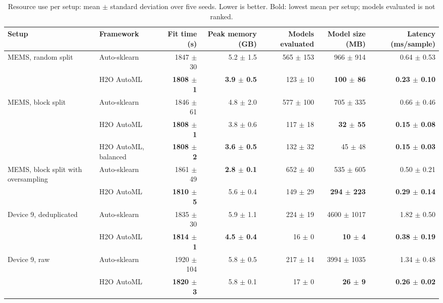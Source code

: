 \begin{table}[t]
\centering
\caption{Resource use per setup: mean $\pm$ standard deviation over five seeds. Lower is better. Bold: lowest mean per setup; models evaluated is not ranked.}
\label{tab:resourcessetup}
\scriptsize
\setlength{\tabcolsep}{3pt}
\begin{tabular}{@{}llrrrrr@{}}
\toprule
Setup & Framework & Fit time (s) & Peak memory (GB) & Models evaluated & Model size (MB) & Latency (ms/sample) \\
\midrule
MEMS, random split & Auto-sklearn & 1847 $\pm$ 30 & 5.2 $\pm$ 1.5 & 565 $\pm$ 153 & 966 $\pm$ 914 & 0.64 $\pm$ 0.53 \\
 & H2O AutoML & \textbf{1808 $\pm$ 1} & \textbf{3.9 $\pm$ 0.5} & 123 $\pm$ 10 & \textbf{100 $\pm$ 86} & \textbf{0.23 $\pm$ 0.10} \\
\midrule
MEMS, block split & Auto-sklearn & 1846 $\pm$ 61 & 4.8 $\pm$ 2.0 & 577 $\pm$ 100 & 705 $\pm$ 335 & 0.66 $\pm$ 0.46 \\
 & H2O AutoML & \textbf{1808 $\pm$ 1} & 3.8 $\pm$ 0.6 & 117 $\pm$ 18 & \textbf{32 $\pm$ 55} & \textbf{0.15 $\pm$ 0.08} \\
 & H2O AutoML, balanced & \textbf{1808 $\pm$ 2} & \textbf{3.6 $\pm$ 0.5} & 132 $\pm$ 32 & 45 $\pm$ 48 & \textbf{0.15 $\pm$ 0.03} \\
\midrule
MEMS, block split with oversampling & Auto-sklearn & 1861 $\pm$ 49 & \textbf{2.8 $\pm$ 0.1} & 652 $\pm$ 40 & 535 $\pm$ 605 & 0.50 $\pm$ 0.21 \\
 & H2O AutoML & \textbf{1810 $\pm$ 5} & 5.6 $\pm$ 0.4 & 149 $\pm$ 29 & \textbf{294 $\pm$ 223} & \textbf{0.29 $\pm$ 0.14} \\
\midrule
Device 9, deduplicated & Auto-sklearn & 1835 $\pm$ 30 & 5.9 $\pm$ 1.1 & 224 $\pm$ 19 & 4600 $\pm$ 1017 & 1.82 $\pm$ 0.50 \\
 & H2O AutoML & \textbf{1814 $\pm$ 1} & \textbf{4.5 $\pm$ 0.4} & 16 $\pm$ 0 & \textbf{10 $\pm$ 4} & \textbf{0.38 $\pm$ 0.19} \\
\midrule
Device 9, raw & Auto-sklearn & 1920 $\pm$ 104 & 5.8 $\pm$ 0.5 & 217 $\pm$ 14 & 3994 $\pm$ 1035 & 1.34 $\pm$ 0.48 \\
 & H2O AutoML & \textbf{1820 $\pm$ 3} & 5.8 $\pm$ 0.1 & 17 $\pm$ 0 & \textbf{26 $\pm$ 9} & \textbf{0.26 $\pm$ 0.02} \\
\bottomrule
\end{tabular}
\end{table}
